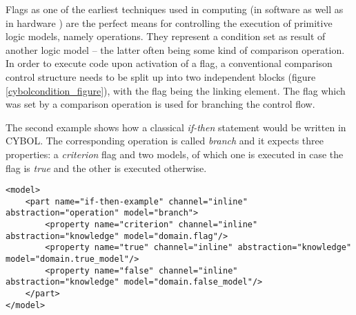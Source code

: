 Flags as one of the earliest techniques used in computing (in software as well
as in hardware \cite{kowalski}) are the perfect means for controlling the
execution of primitive logic models, namely operations. They represent a
condition set as result of another logic model -- the latter often being some
kind of comparison operation. In order to execute code upon activation of a
flag, a conventional comparison control structure needs to be split up into two
independent blocks (figure \ref{cybolcondition_figure}), with the flag being
the linking element. The flag which was set by a comparison operation is used
for branching the control flow.

The second example shows how a classical \emph{if-then} statement would be
written in CYBOL. The corresponding operation is called \emph{branch} and it
expects three properties: a \emph{criterion} flag and two models, of which one
is executed in case the flag is \emph{true} and the other is executed otherwise.

\begin{scriptsize}
    \begin{verbatim}
<model>
    <part name="if-then-example" channel="inline" abstraction="operation" model="branch">
        <property name="criterion" channel="inline" abstraction="knowledge" model="domain.flag"/>
        <property name="true" channel="inline" abstraction="knowledge" model="domain.true_model"/>
        <property name="false" channel="inline" abstraction="knowledge" model="domain.false_model"/>
    </part>
</model>
    \end{verbatim}
\end{scriptsize}
